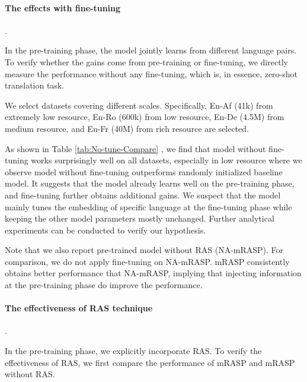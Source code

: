 \documentclass[11pt,a4paper]{article}
\newcommand{\method}{mRASP\xspace}
\begin{document}
\paragraph{The effects with fine-tuning}.

In the pre-training phase, the model jointly learns from different language pairs. 
To verify whether the gains come from pre-training or fine-tuning, we directly measure the performance without any fine-tuning, which is, in essence, zero-shot translation task. 

We select datasets covering different scales. Specifically, En-Af (41k) from extremely low resource, En-Ro (600k) from low resource, En-De (4.5M) from medium resource, and En-Fr (40M) from rich resource are selected.

As shown in Table \ref{tab:No-tune-Compare} , we find that model without fine-tuning works surprisingly well on all datasets, especially in low resource where we observe model without fine-tuning outperforms randomly initialized baseline model. It suggests that the model already learns well on the pre-training phase, and fine-tuning further obtains additional gains. We suspect that the model mainly tunes the embedding of specific language at the fine-tuning phase while keeping the other model parameters mostly unchanged. Further analytical experiments can be conducted to verify our hypothesis. 

Note that we also report pre-trained model without RAS (NA-\method). For comparison, we do not apply fine-tuning on NA-\method. \method consistently obtains better performance that NA-\method, implying that injecting information at the pre-training phase do improve the performance.





\paragraph{The effectiveness of RAS technique}.

In the pre-training phase, we explicitly incorporate RAS. To verify the effectiveness of RAS, we first compare the performance of \method and \method without RAS.
\end{document}
